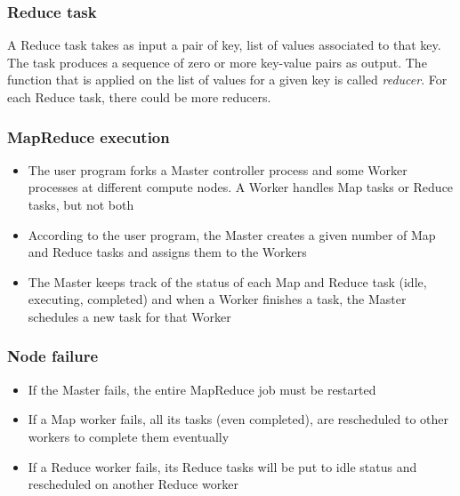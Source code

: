 \documentclass[\main/main.tex]{subfiles}
\begin{document}
\subsubsection{Reduce task}
A Reduce task takes as input a pair of key, list of values associated to that key. The task produces a sequence of zero or more key-value pairs as output. The function that is applied on the list of values for a given key is called \emph{reducer}. For each Reduce task, there could be more reducers.
\subsubsection{MapReduce execution}
\begin{itemize}
    \item The user program forks a Master controller process and some Worker processes at different compute nodes. A Worker handles Map tasks or Reduce tasks, but not both
    \item According to the user program, the Master creates a given number of Map and Reduce tasks and assigns them to the Workers
    \item The Master keeps track of the status of each Map and Reduce task (idle, executing, completed) and when a Worker finishes a task, the Master schedules a new task for that Worker
\end{itemize}
\subsubsection{Node failure}
\begin{itemize}
    \item If the Master fails, the entire MapReduce job must be restarted
    \item If a Map worker fails, all its tasks (even completed), are rescheduled to other workers to complete them eventually
    \item If a Reduce worker fails, its Reduce tasks will be put to idle status and rescheduled on another Reduce worker
\end{itemize}
\end{document}
